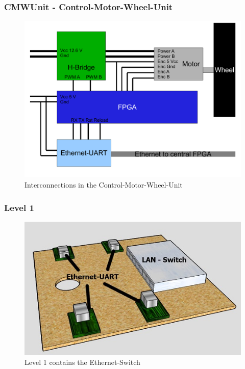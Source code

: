 \documentclass{beamer}
\begin{document}
\begin{frame}
	\frametitle{CMWUnit - Control-Motor-Wheel-Unit}
	\begin{figure}
	\includegraphics[scale=0.5]{figures/cmwunit.pdf}
	\caption{Interconnections in the Control-Motor-Wheel-Unit}
	\end{figure}
\end{frame}

\begin{frame}
	\frametitle{Level 1}
	\begin{figure}
	\includegraphics[scale=0.7]{figures/level1_b.jpg}
	\caption{Level 1 contains the Ethernet-Switch}
	\end{figure}
\end{frame}
\end{document}
